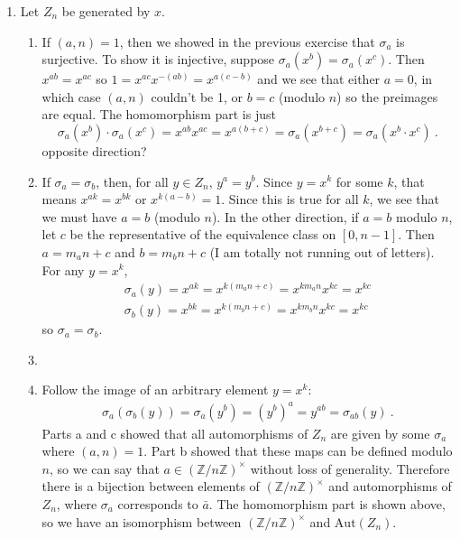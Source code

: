 \documentclass[]{article}
\newcommand{\bbz}{\mathbb{Z}}
\begin{document}
\begin{enumerate}
\item Let $Z_n$ be generated by $x$.
\begin{enumerate}
\item If $(a,n) = 1$, then we showed in the previous exercise that $\sigma_a$ is surjective. To show it is injective, suppose $\sigma_a(x^b) = \sigma_a(x^c)$. Then $x^{ab} = x^{ac}$ so $1 = x^{ac}x^{-(ab)} = x^{a(c-b)}$ and we see that either $a=0$, in which case $(a,n)$ couldn't be 1, or $b = c$ (modulo $n$) so the preimages are equal. The homomorphism part is just 
\begin{equation}
\sigma_a(x^b)\cdot \sigma_a(x^c) = x^{ab}x^{ac} = x^{a(b+c)} = \sigma_a(x^{b+c}) = \sigma_a(x^b\cdot x^c)\ .
\end{equation}
{\color{red} opposite direction?}
\item If $\sigma_a = \sigma_b$, then, for all $y \in Z_n$, $y^a = y^b$. Since $y = x^k$ for some $k$, that means $x^{ak} = x^{bk}$ or $x^{k(a-b)} = 1$. Since this is true for all $k$, we see that we must have $a = b$ (modulo $n$). In the other direction, if $a = b$ modulo $n$, let $c$ be the representative of the equivalence class on $[0,n-1]$. Then $a = m_a n + c$ and $b = m_b n + c$ (I am totally not running out of letters). For any $y = x^k$, 
\begin{align}
\sigma_a(y) = x^{ak} = x^{k(m_a n + c)} = x^{km_an}x^{kc} = x^{kc} \\
\sigma_b(y) = x^{bk} = x^{k(m_b n + c)} = x^{km_bn}x^{kc} = x^{kc}
\end{align}
so $\sigma_a = \sigma_b$.
\item 
\item Follow the image of an arbitrary element $y = x^k$:
\begin{align}
\sigma_a(\sigma_b(y)) = \sigma_a(y^b) = (y^b)^a = y^{ab} = \sigma_{ab}(y)\ .
\end{align}
Parts a and c showed that all automorphisms of $Z_n$ are given by some $\sigma_a$ where $(a,n) = 1$. Part b showed that these maps can be defined modulo $n$, so we can say that $a\in (\bbz/n\bbz)^\times$ without loss of generality. Therefore there is a bijection between elements of $(\bbz/n\bbz)^\times$ and automorphisms of $Z_n$, where $\sigma_a$ corresponds to $\bar{a}$. The homomorphism part is shown above, so we have an isomorphism between $(\bbz/n\bbz)^\times$ and $\text{Aut}(Z_n)$.
\end{enumerate}


\end{enumerate}
\end{document}
